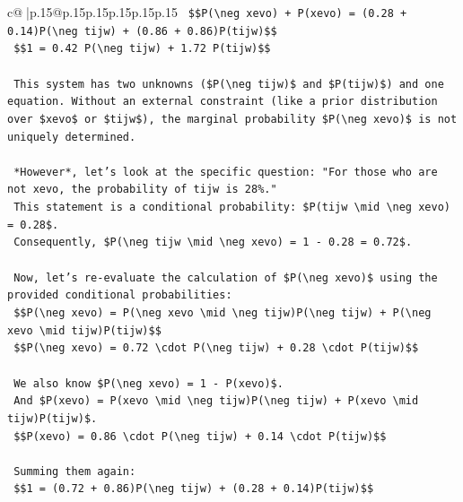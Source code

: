 \documentclass{article}
\begin{document}
{\begin{supertabular}{c@{$\;$}|p{.15\linewidth}@{}p{.15\linewidth}p{.15\linewidth}p{.15\linewidth}p{.15\linewidth}p{.15\linewidth}}
{{{\texttt{    \$\$P(\textbackslash{}neg xevo) + P(xevo) = (0.28 + 0.14)P(\textbackslash{}neg tijw) + (0.86 + 0.86)P(tijw)\$\$} \\
\texttt{    \$\$1 = 0.42 P(\textbackslash{}neg tijw) + 1.72 P(tijw)\$\$} \\
\\ 
\texttt{    This system has two unknowns (\$P(\textbackslash{}neg tijw)\$ and \$P(tijw)\$) and one equation. Without an external constraint (like a prior distribution over \$xevo\$ or \$tijw\$), the marginal probability \$P(\textbackslash{}neg xevo)\$ is not uniquely determined.} \\
\\ 
\texttt{    *However*, let's look at the specific question: "For those who are not xevo, the probability of tijw is 28\%."} \\
\texttt{    This statement is a conditional probability: \$P(tijw \textbackslash{}mid \textbackslash{}neg xevo) = 0.28\$.} \\
\texttt{    Consequently, \$P(\textbackslash{}neg tijw \textbackslash{}mid \textbackslash{}neg xevo) = 1 {-} 0.28 = 0.72\$.} \\
\\ 
\texttt{    Now, let's re{-}evaluate the calculation of \$P(\textbackslash{}neg xevo)\$ using the provided conditional probabilities:} \\
\texttt{    \$\$P(\textbackslash{}neg xevo) = P(\textbackslash{}neg xevo \textbackslash{}mid \textbackslash{}neg tijw)P(\textbackslash{}neg tijw) + P(\textbackslash{}neg xevo \textbackslash{}mid tijw)P(tijw)\$\$} \\
\texttt{    \$\$P(\textbackslash{}neg xevo) = 0.72 \textbackslash{}cdot P(\textbackslash{}neg tijw) + 0.28 \textbackslash{}cdot P(tijw)\$\$} \\
\\ 
\texttt{    We also know \$P(\textbackslash{}neg xevo) = 1 {-} P(xevo)\$.} \\
\texttt{    And \$P(xevo) = P(xevo \textbackslash{}mid \textbackslash{}neg tijw)P(\textbackslash{}neg tijw) + P(xevo \textbackslash{}mid tijw)P(tijw)\$.} \\
\texttt{    \$\$P(xevo) = 0.86 \textbackslash{}cdot P(\textbackslash{}neg tijw) + 0.14 \textbackslash{}cdot P(tijw)\$\$} \\
\\ 
\texttt{    Summing them again:} \\
\texttt{    \$\$1 = (0.72 + 0.86)P(\textbackslash{}neg tijw) + (0.28 + 0.14)P(tijw)\$\$} \\
}}}
\end{supertabular}}
\end{document}
